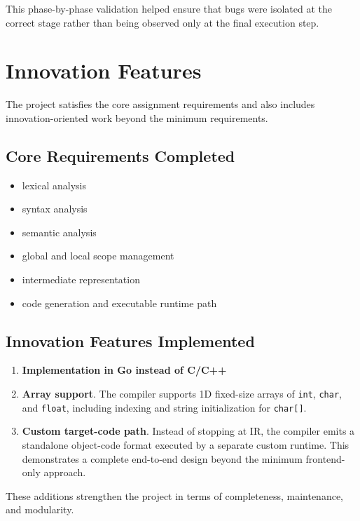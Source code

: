 \documentclass[11pt,a4paper]{article}
\begin{document}
This phase-by-phase validation helped ensure that bugs were isolated at the
correct stage rather than being observed only at the final execution step.

\section{Innovation Features}

The project satisfies the core assignment requirements and also includes
innovation-oriented work beyond the minimum requirements.

\subsection*{Core Requirements Completed}

\begin{itemize}[leftmargin=2em]
    \item lexical analysis
    \item syntax analysis
    \item semantic analysis
    \item global and local scope management
    \item intermediate representation
    \item code generation and executable runtime path
\end{itemize}

\subsection*{Innovation Features Implemented}

\begin{enumerate}[leftmargin=2em]
    \item \textbf{Implementation in Go instead of C/C++}
    \item \textbf{Array support}. The compiler supports 1D fixed-size arrays of
    \texttt{int}, \texttt{char}, and \texttt{float}, including indexing and
    string initialization for \texttt{char[]}.
    \item \textbf{Custom target-code path}. Instead of stopping at IR, the
    compiler emits a standalone object-code format executed by a separate custom
    runtime. This demonstrates a complete end-to-end design beyond the minimum
    frontend-only approach.
\end{enumerate}

These additions strengthen the project in terms of completeness, maintenance, and modularity.
\end{document}
